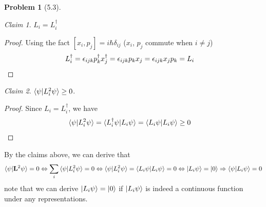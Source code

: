 \documentclass[twoside,11pt]{article}
\theoremstyle{definition}
\newtheorem{problem}{Problem}
\theoremstyle{remark}
\newtheorem*{claim}{Claim}
\begin{document}
\begin{problem}[5.3]
\begin{claim}
    $L_i = L_i^\dagger$
\end{claim}
\begin{proof}
    Using the fact $[x_i,p_j]=i\hbar\delta_{ij}$ ($x_i$, $p_j$ commute when $i\neq j$)
    \begin{align*}
        L_i^\dag &= \epsilon_{ijk}p_k^\dag x_j^\dag = 
        \epsilon_{ijk}p_kx_j = \epsilon_{ijk} x_jp_k = L_i\qedhere
    \end{align*}
\end{proof}
\begin{claim}
    $\braket{\psi|L_i^2\psi}\geq 0$.
\end{claim}
\begin{proof}
    Since $L_i=L_i^\dagger$, we have
    \begin{align*}
        \braket{\psi|L_i^2\psi} &= \braket{L_i^\dagger\psi|L_i\psi} 
        = \braket{L_i\psi|L_i\psi} \geq 0\qedhere
    \end{align*}
\end{proof}

By the claims above, we can derive that
\begin{align*}
    \braket{\psi|\mathbf{L}^2\psi} = 0\Leftrightarrow
    \sum_{i}\braket{\psi|L_i^2\psi} = 0\Leftrightarrow
    \braket{\psi|L_i^2\psi} = \braket{L_i\psi|L_i\psi} = 0
    \Leftrightarrow \ket{L_i\psi} = \ket{0}\Rightarrow
    \braket{\psi|L_i\psi} = 0
\end{align*}
note that we can derive $\ket{L_i\psi}=\ket{0}$ 
if $\ket{L_i\psi}$ is indeed a continuous function under any
representations.


\end{problem}


\end{document}
